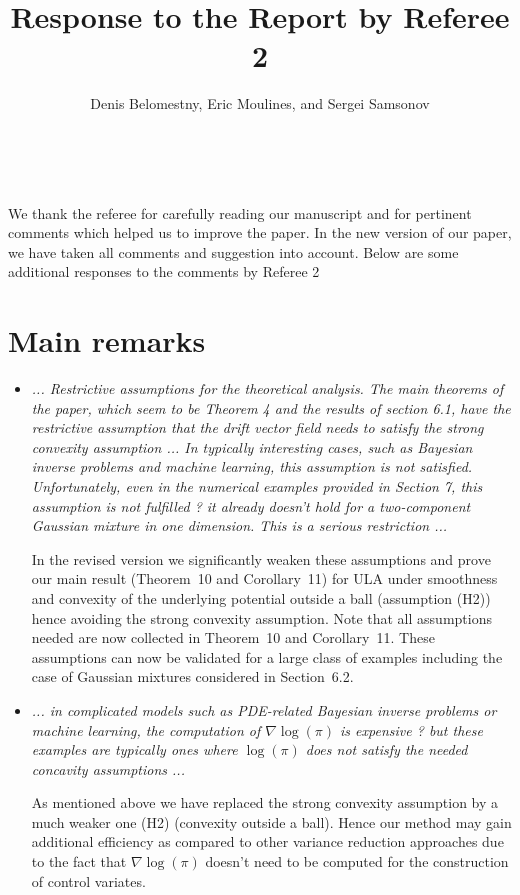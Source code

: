 \documentclass{article}%
\begin{document}
\title{\textbf{Response to the Report by Referee 2}}
\author{{\normalsize \vspace{-1cm} Denis Belomestny, Eric Moulines, and Sergei Samsonov}}
\date{~ }
\maketitle

\vspace{-0.5cm}

We thank the referee for carefully reading our manuscript and for pertinent
comments which helped us to improve the paper. In the new version of our
paper, we have taken all comments and suggestion into account.  Below are some additional responses to the
comments by Referee 2

\section*{Main remarks}

\begin{itemize}

\item \textit{... Restrictive assumptions for the theoretical analysis. The main theorems of the paper, which seem to be Theorem 4 and the results of section 6.1, have the restrictive assumption that the drift vector field  needs to satisfy the strong convexity assumption ... In typically interesting cases, such as Bayesian inverse problems and machine learning, this assumption is not satisfied. Unfortunately, even in the numerical examples provided in Section 7, this assumption is not fulfilled ? it already doesn't hold for a two-component Gaussian mixture in one dimension. This is a serious restriction ... }
\par
In the revised version we significantly weaken  these assumptions and prove our main result (Theorem~10 and Corollary~11) for ULA under smoothness  and convexity of the underlying potential outside a ball (assumption  (H2)) hence avoiding the strong convexity assumption.  Note that all assumptions needed are now collected in Theorem~10 and Corollary~11. These  assumptions can now be validated for a large class of examples including the case of Gaussian mixtures considered in Section~6.2.
\item \textit{... in complicated models such as PDE-related Bayesian inverse problems or machine learning, the computation of \(\nabla \log(\pi)\) is expensive ? but these examples are typically ones where \(\log(\pi)\) does not satisfy the needed concavity assumptions ...}
\par
As mentioned above we have replaced the strong convexity assumption by a much weaker one (H2) (convexity outside a ball). Hence our method may gain additional efficiency as compared to other variance reduction approaches due to the fact that \(\nabla \log(\pi)\) doesn't need to be computed for the construction of control variates.
\end{itemize}
\end{document}

